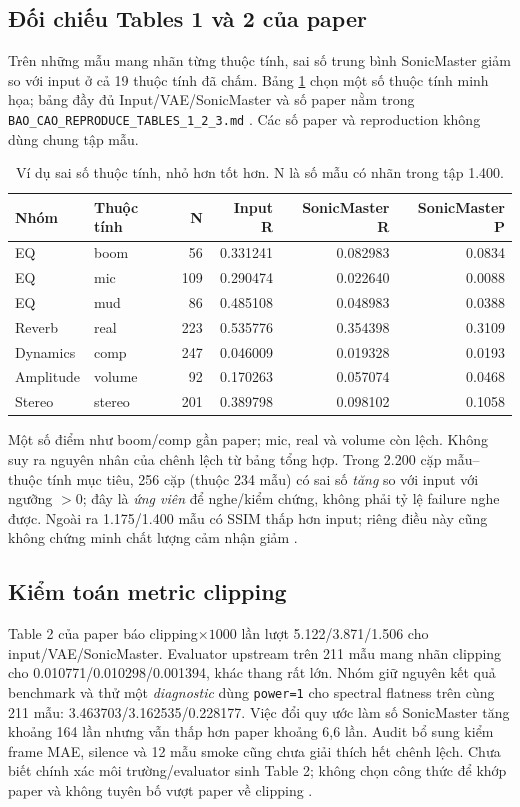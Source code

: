 \documentclass[10pt,a4paper]{article}
\begin{document}
\subsection{Đối chiếu Tables 1 và 2 của paper}
Trên những mẫu mang nhãn từng thuộc tính, sai số trung bình SonicMaster giảm so với input ở cả 19 thuộc tính đã chấm. Bảng \ref{tab:attributes} chọn một số thuộc tính minh họa; bảng đầy đủ Input/VAE/SonicMaster và số paper nằm trong \texttt{BAO\_CAO\_REPRODUCE\_TABLES\_1\_2\_3.md} \cite{tables}. Các số paper và reproduction không dùng chung tập mẫu.
\begin{table}[ht]
\centering\small
\caption{Ví dụ sai số thuộc tính, nhỏ hơn tốt hơn. N là số mẫu có nhãn trong tập 1.400.}
\label{tab:attributes}
\begin{tabular}{llrrrr}
\toprule
Nhóm & Thuộc tính & N & Input R & SonicMaster R & SonicMaster P\\
\midrule
EQ & boom & 56 & 0.331241 & 0.082983 & 0.0834\\
EQ & mic & 109 & 0.290474 & 0.022640 & 0.0088\\
EQ & mud & 86 & 0.485108 & 0.048983 & 0.0388\\
Reverb & real & 223 & 0.535776 & 0.354398 & 0.3109\\
Dynamics & comp & 247 & 0.046009 & 0.019328 & 0.0193\\
Amplitude & volume & 92 & 0.170263 & 0.057074 & 0.0468\\
Stereo & stereo & 201 & 0.389798 & 0.098102 & 0.1058\\
\bottomrule
\end{tabular}
\end{table}
Một số điểm như boom/comp gần paper; mic, real và volume còn lệch. Không suy ra nguyên nhân của chênh lệch từ bảng tổng hợp. Trong 2.200 cặp mẫu--thuộc tính mục tiêu, 256 cặp (thuộc 234 mẫu) có sai số \emph{tăng} so với input với ngưỡng $>0$; đây là \emph{ứng viên} để nghe/kiểm chứng, không phải tỷ lệ failure nghe được. Ngoài ra 1.175/1.400 mẫu có SSIM thấp hơn input; riêng điều này cũng không chứng minh chất lượng cảm nhận giảm \cite{runreport}.

\subsection{Kiểm toán metric clipping}
Table 2 của paper báo clipping$\times1000$ lần lượt 5.122/3.871/1.506 cho input/VAE/SonicMaster. Evaluator upstream trên 211 mẫu mang nhãn clipping cho 0.010771/0.010298/0.001394, khác thang rất lớn. Nhóm giữ nguyên kết quả benchmark và thử một \emph{diagnostic} dùng \texttt{power=1} cho spectral flatness trên cùng 211 mẫu: 3.463703/3.162535/0.228177. Việc đổi quy ước làm số SonicMaster tăng khoảng 164 lần nhưng vẫn thấp hơn paper khoảng 6,6 lần. Audit bổ sung kiểm frame MAE, silence và 12 mẫu smoke cũng chưa giải thích hết chênh lệch. Chưa biết chính xác môi trường/evaluator sinh Table 2; không chọn công thức để khớp paper và không tuyên bố vượt paper về clipping \cite{clipaudit}.
\end{document}
